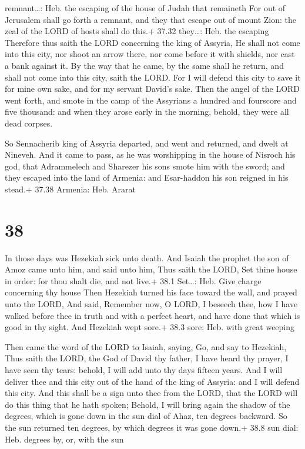 remnant\ldots: Heb. the escaping of the house of Judah that remaineth
 For out of Jerusalem shall go forth a remnant, and they
that escape out of mount Zion: the zeal of the LORD of hosts shall do
this.+ 37.32 they\ldots: Heb. the escaping  Therefore thus
saith the LORD concerning the king of Assyria, He shall not come into
this city, nor shoot an arrow there, nor come before it with shields,
nor cast a bank against it.  By the way that he came, by
the same shall he return, and shall not come into this city, saith the
LORD.  For I will defend this city to save it for mine own
sake, and for my servant David's sake.  Then the angel of
the LORD went forth, and smote in the camp of the Assyrians a hundred
and fourscore and five thousand: and when they arose early in the
morning, behold, they were all dead corpses.

 So Sennacherib king of Assyria departed, and went and
returned, and dwelt at Nineveh.  And it came to pass, as he
was worshipping in the house of Nisroch his god, that Adrammelech and
Sharezer his sons smote him with the sword; and they escaped into the
land of Armenia: and Esar-haddon his son reigned in his stead.+ 37.38
Armenia: Heb. Ararat

\hypertarget{section-37}{%
\section{38}\label{section-37}}

 In those days was Hezekiah sick unto death. And Isaiah the
prophet the son of Amoz came unto him, and said unto him, Thus saith the
LORD, Set thine house in order: for thou shalt die, and not live.+ 38.1
Set\ldots: Heb. Give charge concerning thy house  Then
Hezekiah turned his face toward the wall, and prayed unto the LORD,
 And said, Remember now, O LORD, I beseech thee, how I have
walked before thee in truth and with a perfect heart, and have done that
which is good in thy sight. And Hezekiah wept sore.+ 38.3 sore: Heb.
with great weeping

 Then came the word of the LORD to Isaiah, saying,
 Go, and say to Hezekiah, Thus saith the LORD, the God of
David thy father, I have heard thy prayer, I have seen thy tears:
behold, I will add unto thy days fifteen years.  And I will
deliver thee and this city out of the hand of the king of Assyria: and I
will defend this city.  And this shall be a sign unto thee
from the LORD, that the LORD will do this thing that he hath spoken;
 Behold, I will bring again the shadow of the degrees, which
is gone down in the sun dial of Ahaz, ten degrees backward. So the sun
returned ten degrees, by which degrees it was gone down.+ 38.8 sun dial:
Heb. degrees by, or, with the sun

